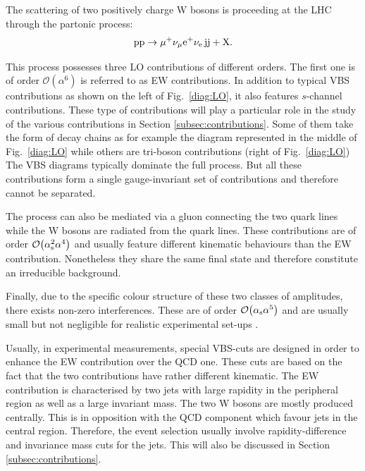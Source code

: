 The scattering of two positively charge W bosons is proceeding at the LHC through the partonic process:
%
\begin{equation}
\text{p}\text{p}\to\mu^+\nu_\mu{\rm e}^+\nu_{\rm e}\,\text{j}\text{j}+\mathrm{X}.
\end{equation}

This process possesses three LO contributions of different orders.
The first one is of order $\mathcal{O}{\left(\alpha^{6}\right)}$ is referred to as EW contributions.
In addition to typical VBS contributions as shown on the left of Fig.~\ref{diag:LO}, it also features $s$-channel contributions.
These type of contributions will play a particular role in the study of the various contributions in Section \ref{subsec:contributions}.
Some of them take the form of decay chains as for example the diagram represented in the middle of Fig.~\ref{diag:LO} while others are tri-boson contributions (right of Fig.~\ref{diag:LO})
The VBS diagrams typically dominate the full process.
But all these contributions form a single gauge-invariant set of contributions and therefore cannot be separated.

The process can also be mediated via a gluon connecting the two quark lines while the W bosons are radiated from the quark lines.
These contributions are of order $\mathcal{O}{\left(\alpha_\text{s}^{2}\alpha^{4}\right)}$ and usually feature different kinematic behaviours than the EW contribution.
Nonetheless they share the same final state and therefore constitute an irreducible background.

Finally, due to the specific colour structure of these two classes of amplitudes, there exists non-zero interferences.
These are of order $\mathcal{O}{\left(\alpha_{\rm s}\alpha^{5}\right)}$ and are usually small but not negligible for realistic experimental set-ups \cite{Biedermann:2017bss}.

Usually, in experimental measurements, special VBS-cuts are designed in order to enhance the EW contribution over the QCD one.
These cuts are based on the fact that the two contributions have rather different kinematic.
The EW contribution is characterised by two jets with large rapidity in the peripheral region as well as a large invariant mass.
The two W bosons are mostly produced centrally.
This is in opposition with the QCD component which favour jets in the central region.
Therefore, the event selection usually involve rapidity-difference and invariance mass cuts for the jets.
This will also be discussed in Section \ref{subsec:contributions}.

